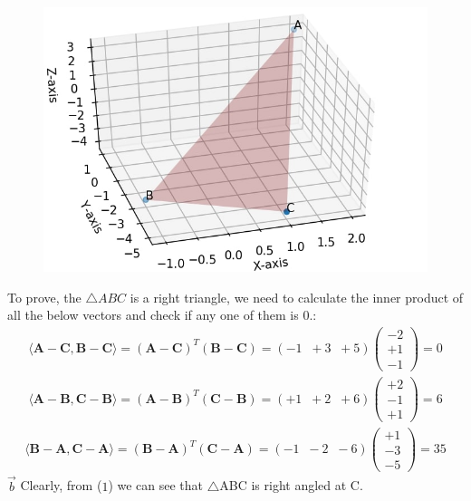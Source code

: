 \documentclass{article}
\newcommand{\vect}[1]{\boldsymbol{#1}}
\newcommand{\myvec}[1]{\ensuremath{\begin{pmatrix}#1\end{pmatrix}}}
\begin{document}
\begin{figure}[!htb]
	
	\centering
	
	\includegraphics[width=\columnwidth]{assignment1fig-1.jpg}
	
	\caption{\label{fig1}}
	
	\label{fig:}
	
\end{figure}

To prove, the $\triangle ABC$ is a right triangle, we need to calculate the inner product of all the below vectors and check if any one of them is 0.:
\begin{align}
	\langle \vect{A}-\vect{C}   ,\vect{B}-\vect{C}\rangle = (\vect{A} -\vect{C})^T (\vect{B}-\vect{C}) = (-1\;\; +3 \;\; +5) \myvec{-2 \\ +1 \\ -1}  = 0
\end{align}
\begin{align}
    \langle \vect{A}-\vect{B}   ,\vect{C}-\vect{B}\rangle = (\vect{A} -\vect{B})^T (\vect{C}-\vect{B})
	 = (+1\;\; +2 \;\; +6) \myvec{+2 \\ -1 \\ +1} = 6 
\end{align}
\begin{align}
	\langle \vect{B}-\vect{A}   ,\vect{C}-\vect{A}\rangle = (\vect{B} -\vect{A})^T (\vect{C}-\vect{A}) = (-1\;\; -2 \;\; -6) \myvec{+1\\-3\\-5} = 35 
\end{align}
$\vec{b}$
Clearly, from ($1$) we can see that $\triangle$ABC is right angled at C.
\end{document}
